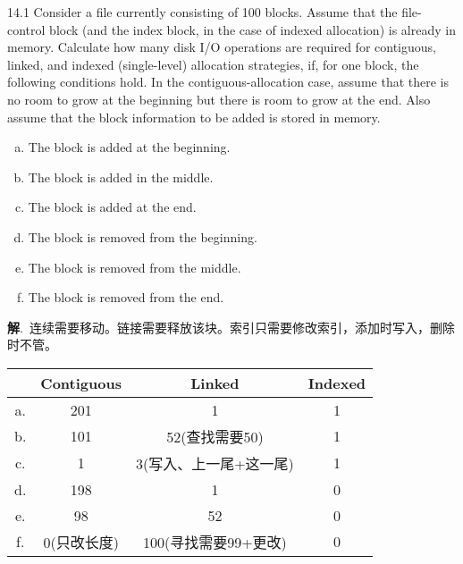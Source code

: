 \documentclass[12pt,a4paper]{article}
\newenvironment{problems}{\begin{list}{}{\renewcommand{\makelabel}[1]{\textbf{##1}\hfil}}}{\end{list}}
\providecommand{\ans}{\textbf{答}:~}
\providecommand{\sol}{\textbf{解}.~}
\begin{document}
\begin{problems}

    \item[14.1] Consider a file currently consisting of 100 blocks. Assume that the file-control block (and the index block, in the case of indexed allocation) is already in memory. Calculate how many disk I/O operations are required for contiguous, linked, and indexed (single-level) allocation strategies, if, for one block, the following conditions hold. In the contiguous-allocation case, assume that there is no room to grow at the beginning but there is room to grow at the end. Also assume that the block information to be added is stored in memory.
    \begin{enumerate}[a.]
        \item The block is added at the beginning.
        \item The block is added in the middle.
        \item The block is added at the end.
        \item The block is removed from the beginning.
        \item The block is removed from the middle.
        \item The block is removed from the end.
    \end{enumerate} 

    \sol 连续需要移动。链接需要释放该块。索引只需要修改索引，添加时写入，删除时不管。

    \begin{tabular}{c|ccc}
            & Contiguous & Linked & Indexed \\
            \hline
        a.  & 201        & 1      & 1       \\
        b.  & 101        & 52(查找需要50)     & 1       \\
        c.  & 1          & 3(写入、上一尾+这一尾) & 1\\
        d.  & 198        & 1      & 0       \\
        e.  & 98         & 52     & 0       \\
        f.  & 0(只改长度) & 100(寻找需要99+更改) & 0 \\
    \end{tabular}
\end{problems}
\end{document}

